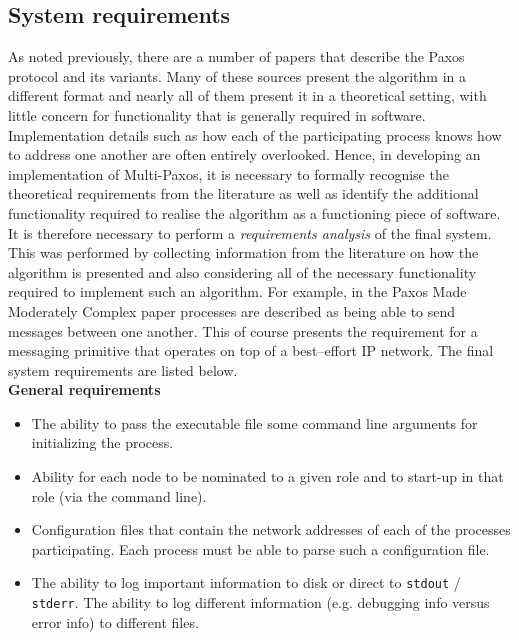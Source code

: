 \subsection{System requirements}

As noted previously, there are a number of papers that describe the Paxos protocol and its variants. Many of these sources present the algorithm in a different format and nearly all of them present it in a theoretical setting, with little concern for functionality that is generally required in software. Implementation details such as how each of the participating process knows how to address one another are often entirely overlooked. Hence, in developing an implementation of Multi-Paxos, it is necessary to formally recognise the theoretical requirements from the literature as well as identify the additional functionality required to realise the algorithm as a functioning piece of software. \\

It is therefore necessary to perform a \emph{requirements analysis} of the final system. This was performed by collecting information from the literature on how the algorithm is presented and also considering all of the necessary functionality required to implement such an algorithm. For example, in the Paxos Made Moderately Complex paper processes are described as being able to send messages between one another. This of course presents the requirement for a messaging primitive that operates on top of a best--effort IP network. The final system requirements are listed below. \\

\textbf{General requirements}
\begin{itemize}
  \item The ability to pass the executable file some command line arguments for initializing the process.
  \item Ability for each node to be nominated to a given role and to start-up in that role (via the command line).
  \item Configuration files that contain the network addresses of each of the processes participating. Each process must be able to parse such a configuration file.
  \item The ability to log important information to disk or direct to \texttt{stdout} / \texttt{stderr}. The ability to log different information (e.g. debugging info versus error info) to different files.
\end{itemize}

